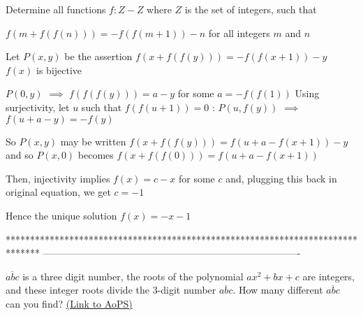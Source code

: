 \begin{solution}
	\begin{tcolorbox}Determine all functions $f:Z - Z$ where $Z$ is the set of integers, such that 

$f(m+f(f(n)))=-f(f(m+1))-n$ for all integers $m$ and $n$\end{tcolorbox}
Let $P(x,y)$ be the assertion $f(x+f(f(y)))=-f(f(x+1))-y$
$f(x)$ is bijective

$P(0,y)$ $\implies$ $f(f(f(y)))=a-y$ for some $a=-f(f(1))$
Using surjectivity, let $u$ such that $f(f(u+1))=0$ : $P(u,f(y))$ $\implies$  $f(u+a-y)=-f(y)$

So $P(x,y)$ may be written $f(x+f(f(y)))=f(u+a-f(x+1))-y$ and so $P(x,0)$ becomes $f(x+f(f(0)))=f(u+a-f(x+1))$

Then, injectivity implies $f(x)=c-x$ for some $c$ and, plugging this back in original equation, we get $c=-1$

Hence the unique solution $\boxed{f(x)=-x-1}$
\end{solution}
*******************************************************************************
-------------------------------------------------------------------------------

\begin{problem}
	$\overline{abc}$ is a three digit number, the roots of the polynomial $ ax^2 + bx +c $  are integers, and these integer roots divide the $3$-digit number $\overline{abc}$. How many different $\overline{abc}$ can you find?
	\flushright \href{https://artofproblemsolving.com/community/q1h581335}{(Link to AoPS)}
\end{problem}



